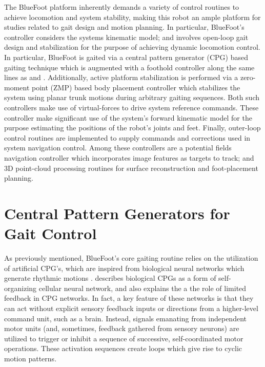 		The BlueFoot platform inherently demands a variety of control routines to achieve locomotion and system stability, making this robot an ample platform for studies related to gait design and motion planning. In particular, BlueFoot's controller considers the systems kinematic model; and involves open-loop gait design and stabilization for the purpose of achieving dynamic locomotion control. In particular, BlueFoot is gaited via a central pattern generator (CPG) based gaiting technique which is augmented with a foothold controller along the same lines as \cite{Ajallooeian2013} and \cite{Rutishauser2008}. Additionally, active platform stabilization is performed via a zero-moment point (ZMP) based body placement controller which stabilizes the system using planar trunk motions during arbitrary gaiting sequences. Both such controllers make use of virtual-forces to drive system reference commands. These controller make significant use of the system's forward kinematic model for the purpose estimating the positions of the robot's joints and feet. Finally, outer-loop control routines are implemented to supply commands and corrections used in system navigation control. Among these controllers are a potential fields navigation controller which incorporates image features as targets to track; and 3D point-cloud processing routines for surface reconstruction and foot-placement planning.

	\section{Central Pattern Generators for Gait Control}

		As previously mentioned, BlueFoot's core gaiting routine relies on the utilization of artificial CPG's, which are inspired from biological neural networks which generate rhythmic motions \cite{Ijspeert2008}. \cite{Arena2000} describes biological CPGs as a form of self-organizing cellular neural network, and also explains the a the role of limited feedback in CPG networks. In fact, a key feature of these networks is that they can act without explicit sensory feedback inputs or directions from a higher-level command unit, such as a brain. Instead, signals emanating from independent motor units (and, sometimes, feedback gathered from sensory neurons) are utilized to trigger or inhibit a sequence of successive, self-coordinated motor operations. These activation sequences create loops which give rise to cyclic motion patterns. 

